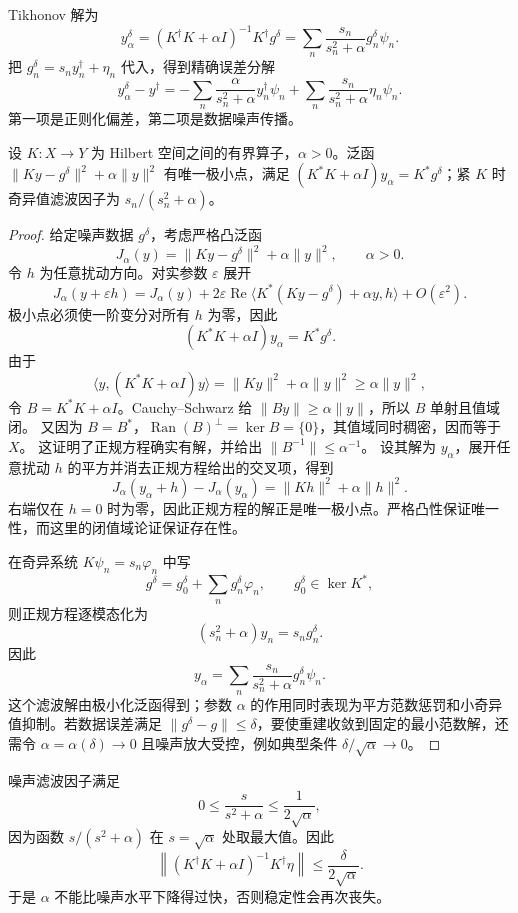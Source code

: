 Tikhonov 解为
\[
y_\alpha^\delta
=(K^\dagger K+\alpha I)^{-1}K^\dagger g^\delta
=\sum_n\frac{s_n}{s_n^2+\alpha}g_n^\delta\psi_n.
\]
把 $g_n^\delta=s_ny_n^\dagger+\eta_n$ 代入，得到精确误差分解
\begin{equation*}\boxed{
y_\alpha^\delta-y^\dagger
=-\sum_n\frac{\alpha}{s_n^2+\alpha}y_n^\dagger\psi_n
+\sum_n\frac{s_n}{s_n^2+\alpha}\eta_n\psi_n
}.\end{equation*}
第一项是正则化偏差，第二项是数据噪声传播。

\begin{proposition}
设 $K:X\to Y$ 为 Hilbert 空间之间的有界算子，$\alpha>0$。泛函 $\|Ky-g^\delta\|^2+\alpha\|y\|^2$ 有唯一极小点，满足 $(K^*K+\alpha I)y_\alpha=K^*g^\delta$；紧 $K$ 时奇异值滤波因子为 $s_n/(s_n^2+\alpha)$。
\end{proposition}
\begin{proof}
给定噪声数据 $g^\delta$，考虑严格凸泛函
\[
J_\alpha(y)
=\|Ky-g^\delta\|^2
+\alpha\|y\|^2,
\qquad \alpha>0.
\]
令 $h$ 为任意扰动方向。对实参数 $\varepsilon$ 展开
\[
J_\alpha(y+\varepsilon h)
=J_\alpha(y)
+2\varepsilon\operatorname{Re}
\langle K^*(Ky-g^\delta)+\alpha y,h\rangle
+O(\varepsilon^2).
\]
极小点必须使一阶变分对所有 $h$ 为零，因此
\[
(K^*K+\alpha I)y_\alpha=K^*g^\delta.
\]
由于
\[
\langle y,(K^*K+\alpha I)y\rangle
=\|Ky\|^2+\alpha\|y\|^2
\ge\alpha\|y\|^2,
\]
令 $B=K^*K+\alpha I$。Cauchy--Schwarz 给 $\|By\|\ge\alpha\|y\|$，所以 $B$ 单射且值域闭。
又因为 $B=B^*$，$\operatorname{Ran}(B)^\perp=\ker B=\{0\}$，其值域同时稠密，因而等于 $X$。
这证明了正规方程确实有解，并给出 $\|B^{-1}\|\le\alpha^{-1}$。
设其解为 $y_\alpha$，展开任意扰动 $h$ 的平方并消去正规方程给出的交叉项，得到
\[
J_\alpha(y_\alpha+h)-J_\alpha(y_\alpha)=\|Kh\|^2+\alpha\|h\|^2.
\]
右端仅在 $h=0$ 时为零，因此正规方程的解正是唯一极小点。严格凸性保证唯一性，而这里的闭值域论证保证存在性。

在奇异系统 $K\psi_n=s_n\varphi_n$ 中写
\[
g^\delta=g_0^\delta+\sum_n g_n^\delta\varphi_n,
\qquad g_0^\delta\in\ker K^*,
\]
则正规方程逐模态化为
\[
(s_n^2+\alpha)y_n=s_ng_n^\delta.
\]
因此
\[
y_\alpha
=\sum_n\frac{s_n}{s_n^2+\alpha}g_n^\delta\psi_n.
\]
这个滤波解由极小化泛函得到；参数 $\alpha$ 的作用同时表现为平方范数惩罚和小奇异值抑制。若数据误差满足 $\|g^\delta-g\|\le\delta$，要使重建收敛到固定的最小范数解，还需令 $\alpha=\alpha(\delta)\to0$ 且噪声放大受控，例如典型条件 $\delta/\sqrt{\alpha}\to0$。
\end{proof}


噪声滤波因子满足
\[
0\le \frac{s}{s^2+\alpha}\le\frac1{2\sqrt\alpha},
\]
因为函数 $s/(s^2+\alpha)$ 在 $s=\sqrt\alpha$ 处取最大值。因此
\[
\left\|
(K^\dagger K+\alpha I)^{-1}K^\dagger\eta
\right\|
\le\frac{\delta}{2\sqrt\alpha}.
\]
于是 $\alpha$ 不能比噪声水平下降得过快，否则稳定性会再次丧失。

